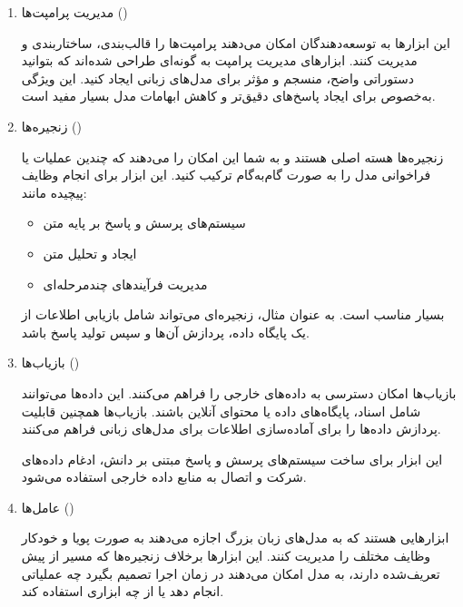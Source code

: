 \documentclass[11pt, a4paper, oneside]{book}
\begin{document}
				\begin{enumerate}
					
					\item {\large مدیریت پرامپت‌ها ()} \par
					این ابزارها به توسعه‌دهندگان امکان می‌دهند پرامپت‌ها را قالب‌بندی، ساختاربندی و مدیریت کنند. ابزارهای مدیریت پرامپت به گونه‌ای طراحی شده‌اند که بتوانید دستوراتی واضح، منسجم و مؤثر برای مدل‌های زبانی ایجاد کنید. این ویژگی به‌خصوص برای ایجاد پاسخ‌های دقیق‌تر و کاهش ابهامات مدل بسیار مفید است.
					
					\item {\large زنجیره‌ها ()} \par
					زنجیره‌ها هسته اصلی  هستند و به شما این امکان را می‌دهند که چندین عملیات یا فراخوانی مدل را به صورت گام‌به‌گام ترکیب کنید. این ابزار برای انجام وظایف پیچیده مانند:
					
					\begin{itemize}
						
						\item سیستم‌های پرسش و پاسخ بر پایه متن
						
						\item ایجاد و تحلیل متن
						
						\item مدیریت فرآیندهای چندمرحله‌ای
						
					\end{itemize}
					
					بسیار مناسب است. به عنوان مثال، زنجیره‌ای می‌تواند شامل بازیابی اطلاعات از یک پایگاه داده، پردازش آن‌ها و سپس تولید پاسخ باشد.
					
					\item {\large بازیاب‌ها ()} \par
					بازیاب‌ها امکان دسترسی به داده‌های خارجی را فراهم می‌کنند. این داده‌ها می‌توانند شامل اسناد، پایگاه‌های داده یا محتوای آنلاین باشند. بازیاب‌ها همچنین قابلیت پردازش داده‌ها را برای آماده‌سازی اطلاعات برای مدل‌های زبانی فراهم می‌کنند.
					
					این ابزار برای ساخت سیستم‌های پرسش و پاسخ مبتنی بر دانش، ادغام داده‌های شرکت و اتصال به منابع داده خارجی استفاده می‌شود.
					
					\item {\large عامل‌ها ()} \par
					ابزارهایی هستند که به مدل‌های زبان بزرگ اجازه می‌دهند به صورت پویا و خودکار وظایف مختلف را مدیریت کنند. این ابزارها برخلاف زنجیره‌ها که مسیر از پیش تعریف‌شده دارند، به مدل امکان می‌دهند در زمان اجرا تصمیم بگیرد چه عملیاتی انجام دهد یا از چه ابزاری استفاده کند.
					

\end{enumerate}
\end{document}
